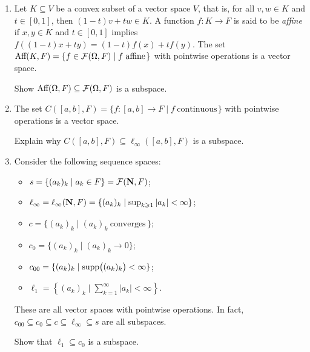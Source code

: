 \begin{example}
\begin{enumerate}[label = (\arabic*),itemsep=1pt,topsep=3pt]
            \item Let $K \subseteq V$ be a convex subset of a vector space $V$, that is, for all $v,w \in K$ and $t \in [0,1]$, then $(1-t)v + tw \in K$. A function $f:K \rightarrow F$ is said to be \textit{affine} if $x,y \in K$ and $t \in [0,1]$ implies $f((1-t)x + ty) = (1-t)f(x) + tf(y)$. The set \newline $\text{Aff}(K,F) = \{f \in \mathcal{F}(\Omega,F) \mid f \hspace{3pt}\text{affine}\hspace{1pt}\}$ with pointwise operations is a vector space.
                \begin{exercise}
                    Show $\text{Aff}(\Omega,F) \subseteq \mathcal{F}(\Omega,F)$ is a subspace.
                \end{exercise}
            \item The set $C([a,b],F) = \{f:[a,b] \rightarrow F \mid f \hspace{3pt}\text{continuous}\hspace{1pt}\}$ with pointwise operations is a vector space.
                \begin{exercise}
                    Explain why $C([a,b],F) \subseteq \ell_\infty([a,b],F)$ is a subspace.
                \end{exercise}
            \item Consider the following sequence spaces:
                \begin{itemize}
                    \item $s = \{(a_k)_k \mid a_k \in F\} = \mathcal{F}(\mathbf{N},F)$;
                    \item $\ell_\infty = \ell_\infty(\mathbf{N},F) = \{(a_k)_k \mid \sup_{k \geqslant 1}|a_k| < \infty\}$;
                    \item $c = \{(a_k)_k \mid (a_k)_k \hspace{3pt}\text{converges}\hspace{2pt}\}$;
                    \item $c_0 = \{(a_k)_k \mid (a_k)_k \rightarrow 0\}$;
                    \item $c_{00} = \{(a_k)_k \mid \operatorname{supp}\bigl((a_k)_k\bigr) < \infty\}$;
                    \item $\ell_1 = \left\{ (a_k)_k \mid \sum_{k = 1}^\infty |a_k| < \infty \right\}$.
                \end{itemize}
            These are all vector spaces with pointwise operations. In fact, $c_{00} \subseteq c_0 \subseteq c \subseteq \ell_\infty \subseteq s$ are all subspaces.
                \begin{exercise}
                    Show that $\ell_1 \subseteq c_0$ is a subspace.
                \end{exercise}


\end{enumerate}
\end{example}
